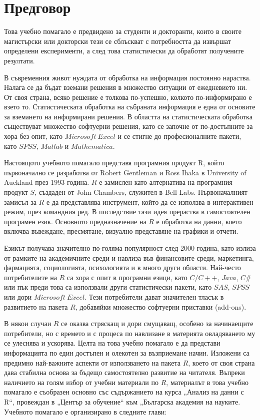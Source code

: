 \newpage
{}
\chapter*{Предговор}
\setcounter{page}{1}
\thispagestyle{empty}

Това учебно помагало е предвидено за студенти и докторанти, които в своите магистърски или докторски тези се сблъскват с потребността да извършат определени експерименти, а след това статистически да обработят получените резултати.

В съвременния живот нуждата от обработка на информация постоянно нараства. Налага се да бъдат вземани решения в множество ситуации от ежедневието ни. От своя страна, всяко решение е толкова по-успешно, колкото по-информирано е взето то. Статистическата обработка на събраната информация е една от основите за вземането на информирани решения. В областта на статистическата обработка съществуват множество софтуерни решения, като се започне от по-достъпните за хора без опит, като $Microsoft\ Excel$ и се стигне до професионалните пакети, като $SPSS$\cite{spss}, $Matlab$\cite{matlab} и $Mathematica$\cite{mathematica}.

Настоящото учебното помагало представя програмния продукт R, който първоначално се разработва от Robert Gentleman и Ross Ihaka в University of Auckland през 1993 година. $R$ е замислен като алтернатива на програмния продукт $S$, създаден от John Chambers, служител в Bell Labs. Първоначалният замисъл за $R$ е да представлява инструмент, който да се използва в интерактивен режим, през командния ред. В последствие тази идея прераства в самостоятелен програмен език. Основното предназначение на $R$ е обработка на данни, което включва въвеждане, пресмятане, визуално представяне на графики и отчети.

Езикът получава значително по-голяма популярност след 2000 година, като излиза от рамките на академичните среди и навлиза във финансовите среди, маркетинга, фармацията, социологията, психологията и в много други области. Най-често потребителите на $R$ са хора с опит в програмни езици, като $C/C++$\cite{cpp}, $Java$\cite{java}, $C\#$\cite{csharp} или пък преди това са използвали други статистически пакети, като $SAS$\cite{sas}, $SPSS$ или дори $Microsoft\ Excel$. Тези потребители дават значителен тласък в развитието на пакета $R$, добавяйки множество софтуерни приставки (add-ons).

В някои случаи $R$ се оказва стряскащ и дори смущаващ, особено за начинаещите потребители, но с времето и с процеса по навлизане в материята овладяването му се улеснява и ускорява. Целта на това учебно помагало е да представи информацията по един достъпен и олекотен за възприемане начин. Изложени са предимно най-важните аспекти от използването на пакета $R$, което от своя страна дава стабилна основа за бъдещо самостоятелно развитие на читателя. Въпреки наличието на голям избор от учебни материали по $R$\cite{r01,r02,r03,r04,r05,r06,r07,r08,r09,r10}, материалът в това учебно помагало е съобразен основно със съдържанието на курса „Анализ на данни с R“, провеждан в „Център за обучение“ към „Българска академия на науките. Учебното помагало е организирано в следните глави:

